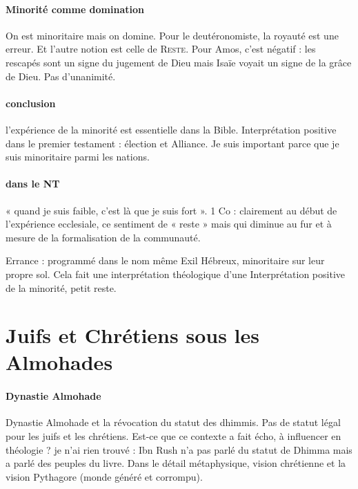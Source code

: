 \paragraph{Minorité comme domination} On est minoritaire mais on domine. Pour le deutéronomiste, la royauté est une erreur. Et l’autre notion est celle de \textsc{Reste}. Pour Amos, c’est négatif : les rescapés sont un signe du jugement de Dieu mais Isaïe voyait un signe de la grâce de Dieu. Pas d’unanimité. 

\paragraph{conclusion} l’expérience de la minorité est essentielle dans la Bible. Interprétation positive dans le premier testament : élection et Alliance. Je suis important parce que je suis minoritaire parmi les nations.

\paragraph{dans le NT} « quand je suis faible, c’est là que je suis fort ». 1 Co : clairement au début de l’expérience ecclesiale, ce sentiment de « reste » mais qui diminue au fur et à mesure de la formalisation de la communauté.
 

\begin{Synthesis}
Errance : programmé dans le nom même
Exil
Hébreux, minoritaire sur leur propre sol.
Cela fait une interprétation théologique d’une Interprétation positive de la minorité, petit reste.
\end{Synthesis}
\section{Juifs et Chrétiens sous les Almohades}
\paragraph{Dynastie Almohade}
Dynastie Almohade et la révocation du statut des dhimmis. Pas de statut légal pour les juifs et les chrétiens.  Est-ce que ce contexte a fait écho, à influencer en théologie ? je n’ai rien trouvé : Ibn Rush n’a pas parlé du statut de Dhimma mais a parlé des peuples du livre. Dans le détail métaphysique, vision chrétienne et la vision Pythagore (monde généré et corrompu). 
